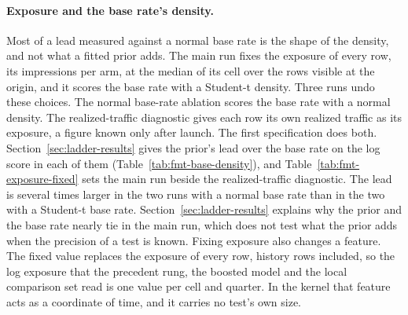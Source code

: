 \paragraph{Exposure and the base rate's density.}
Most of a lead measured against a normal base rate is the shape of the density, and not what a fitted prior adds. The main run fixes the exposure of every row, its impressions per arm, at the median of its cell over the rows visible at the origin, and it scores the base rate with a Student-t density. Three runs undo these choices. The normal base-rate ablation scores the base rate with a normal density. The realized-traffic diagnostic gives each row its own realized traffic as its exposure, a figure known only after launch. The first specification does both. Section~\ref{sec:ladder-results} gives the prior's lead over the base rate on the log score in each of them (Table~\ref{tab:fmt-base-density}), and Table~\ref{tab:fmt-exposure-fixed} sets the main run beside the realized-traffic diagnostic. The lead is several times larger in the two runs with a normal base rate than in the two with a Student-t base rate. Section~\ref{sec:ladder-results} explains why the prior and the base rate nearly tie in the main run, which does not test what the prior adds when the precision of a test is known. Fixing exposure also changes a feature. The fixed value replaces the exposure of every row, history rows included, so the log exposure that the precedent rung, the boosted model and the local comparison set read is one value per cell and quarter. In the kernel that feature acts as a coordinate of time, and it carries no test's own size.

